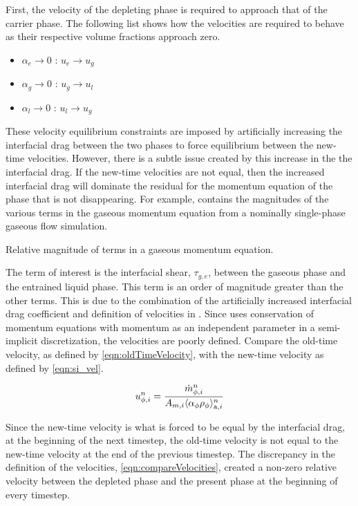 First, the velocity of the depleting phase is required to approach that of the carrier phase.
The following list shows how the velocities are required to behave as their respective volume fractions approach zero.
\begin{itemize}
\item{ $\alpha_e \rightarrow 0$ : $u_e \rightarrow u_g$}
\item{ $\alpha_g \rightarrow 0$ : $u_g \rightarrow u_l$}
\item{ $\alpha_l \rightarrow 0$ : $u_l \rightarrow u_g$}
\end{itemize}
These velocity equilibrium constraints are imposed by artificially increasing the interfacial drag between the two phases to force equilibrium between the new-time velocities.
However, there is a subtle issue created by this increase in the the interfacial drag.
If the new-time velocities are not equal, then the increased interfacial drag will dominate the residual for the momentum equation of the phase that is not disappearing.
For example,  contains the magnitudes of the various terms in the gaseous momentum equation from a nominally single-phase gaseous flow simulation.

\begin{table}[ht]
\centering
\singlespace

\caption{Relative magnitude of terms in a gaseous momentum equation.}
\label{tab:gasMomentumResidual}
\end{table}

The term of interest is the interfacial shear, $\tau_{g,e}$, between the gaseous phase and the entrained liquid phase.
This term is an order of magnitude greater than the other terms.
This is due to the combination of the artificially increased interfacial drag coefficient and definition of velocities in \cobra{}.
Since \cobra{} uses conservation of momentum equations with momentum as an independent parameter in a semi-implicit discretization, the velocities are poorly defined.
Compare the old-time velocity, as defined by \eqref{eqn:oldTimeVelocity}, with the new-time velocity as defined by \eqref{eqn:si_vel}.

\begin{equation}
\label{eqn:oldTimeVelocity}
u^{n}_{\phi, i} = \frac{\dot{m}^{n}_{\phi, i}}{A_{m, i} \ave{\alpha_{\phi} \rho_{\phi}}^{n}_{\text{a}, i}} 
\end{equation}

Since the new-time velocity is what is forced to be equal by the interfacial drag, at the beginning of the next timestep, the old-time velocity is not equal to the new-time velocity at the end of the previous timestep.
The discrepancy in the definition of the velocities, \eqref{eqn:compareVelocities}, created a non-zero relative velocity between the depleted phase and the present phase at the beginning of every timestep.

